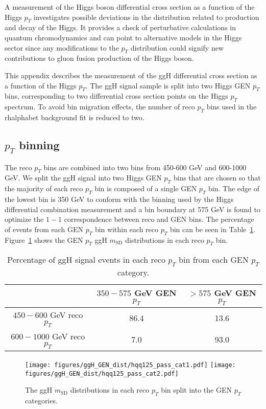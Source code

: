 
A measurement of the Higgs boson differential cross section as a function of the Higgs $p_{T}$ investigates possible deviations in the distribution related to production and decay of the Higgs. It provides a check of perturbative calculations in quantum chromodynamics and can point to alternative models in the Higgs sector since any modifications to the $p_{T}$ distribution could signify new contributions to gluon fusion production of the Higgs boson.

This appendix describes the measurement of the ggH differential cross section as a function of the Higgs $p_{T}$. The ggH signal sample is split into two Higgs GEN $p_{T}$ bins, corresponding to two differential cross section points on the Higgs $p_{T}$ spectrum. To avoid bin migration effects, the number of reco $p_{T}$ bins used in the rhalphabet background fit is reduced to two.

\subsection{$p_{T}$ binning}
The reco $p_{T}$ bins are combined into two bins from 450-600 GeV and 600-1000 GeV. We split the ggH signal into two Higgs GEN $p_{T}$ bins that are chosen so that the majority of each reco $p_{T}$ bin is composed of a single GEN $p_{T}$ bin. The edge of the lowest bin is 350 GeV to conform with the binning used by the Higgs differential combination measurement and a bin boundary at 575 GeV is found to optimize the $1-1$ correspondence between reco and GEN bins. The percentage of events from each GEN $p_{T}$ bin within each reco $p_{T}$ bin can be seen in Table~\ref{tab:GENperc}. Figure~\ref{fig:GENdist} shows the GEN $p_{T}$ ggH $m_\mathrm{SD}$ distributions in each reco $p_{T}$ bin. 

\begin{table}[htbp]
\centering
  \begin{tabular}{ccc}
  \hline
   & $350 - 575$ GeV GEN $p_{T}$ & $> 575$ GeV GEN $p_{T}$\\
  \hline
$450 - 600$ GeV reco $p_{T}$ & 86.4 &  13.6 \\
$600 - 1000$ GeV reco $p_{T}$ & 7.0 &  93.0 \\
  \hline
  \end{tabular}
  \caption{Percentage of ggH signal events in each reco $p_{T}$ bin from each GEN $p_{T}$ category.} \label{tab:GENperc}
\end{table}

\begin{figure}[hbtp]
\centering
\texttt{[image: figures/ggH\_GEN\_dist/hqq125\_pass\_cat1.pdf]}
\texttt{[image: figures/ggH\_GEN\_dist/hqq125\_pass\_cat2.pdf]} \\
 \caption{The ggH $m_\mathrm{SD}$ distributions in each reco $p_{T}$ bin split into the GEN $p_{T}$ categories.}
 \label{fig:GENdist}
 \end{figure}


